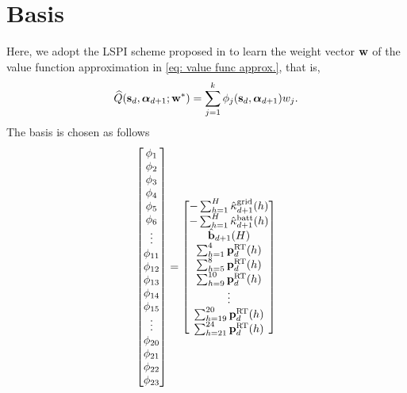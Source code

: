 \section{Basis}\label{subsec: Basis}

{\blue
Here, we adopt the LSPI scheme proposed in \cite{lagoudakis:2003} to learn the weight vector ${\mathbf w}$ of the value function approximation in  \eqref{eq: value func approx.}, that is,
\begin{equation}
    \widehat{Q}({\mathbf s}_d, \boldsymbol{\alpha}_{d+1}; {\mathbf w}^*) = \sum_{j=1}^{k} \phi_j({\mathbf s}_d, \boldsymbol{\alpha}_{d+1})w_j.
\end{equation}
The basis is chosen as follows
\begin{equation}
    \begin{bmatrix}
        \phi_1 \\
        \phi_2 \\
        \phi_3 \\
        \phi_4 \\
        \phi_5 \\
        \phi_6 \\
        \vdots\\
        \phi_{11} \\
        \phi_{12} \\
        \phi_{13} \\
        \phi_{14} \\
        \phi_{15} \\
        \vdots\\
        \phi_{20} \\
        \phi_{21} \\
        \phi_{22} \\
        \phi_{23}
    \end{bmatrix}
    =
    \begin{bmatrix}
        -\sum_{h=1}^H\hat\kappa^\text{grid}_{d+1}(h) \\
        -\sum_{h=1}^H\hat\kappa^\text{batt}_{d+1}(h) \\
        \hat{{\mathbf b}}_{d+1}(H) \\
        \sum_{h=1}^4{\mathbf p}^{\text{RT}}_d(h) \\
        \sum_{h=5}^8{\mathbf p}^{\text{RT}}_d(h) \\
        \sum_{h=9}^{10}{\mathbf p}^{\text{RT}}_d(h) \\
        \vdots\\
        \sum_{h=19}^{20}{\mathbf p}^{\text{RT}}_d(h) \\
        \sum_{h=21}^{24}{\mathbf p}^{\text{RT}}_d(h) \\

\end{bmatrix}
\end{equation}}
